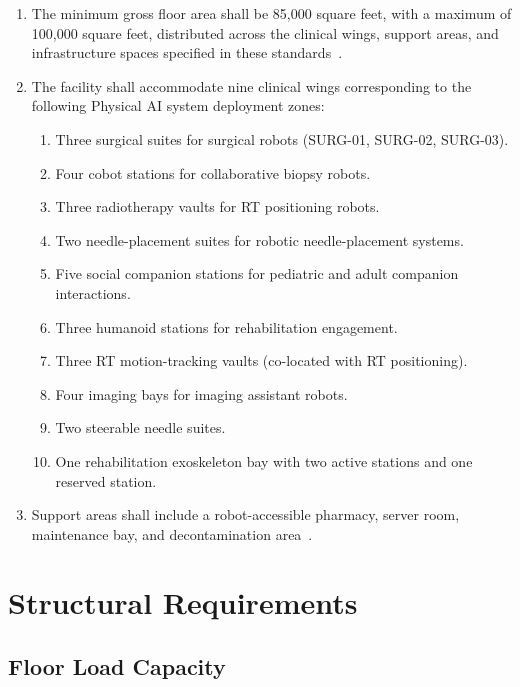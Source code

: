 \begin{enumerate}[label=(\alph*)]
\item The minimum gross floor area shall be 85,000 square feet, with a maximum
  of 100,000 square feet, distributed across the clinical wings, support areas,
  and infrastructure spaces specified in these standards~\cite{sitespec2026}.

\item The facility shall accommodate nine clinical wings corresponding to the
  following Physical AI system deployment zones:
  \begin{enumerate}[label=(\arabic*)]
  \item Three surgical suites for surgical robots (SURG-01, SURG-02, SURG-03).
  \item Four cobot stations for collaborative biopsy robots.
  \item Three radiotherapy vaults for RT positioning robots.
  \item Two needle-placement suites for robotic needle-placement systems.
  \item Five social companion stations for pediatric and adult companion
    interactions.
  \item Three humanoid stations for rehabilitation engagement.
  \item Three RT motion-tracking vaults (co-located with RT positioning).
  \item Four imaging bays for imaging assistant robots.
  \item Two steerable needle suites.
  \item One rehabilitation exoskeleton bay with two active stations and one
    reserved station.
  \end{enumerate}

\item Support areas shall include a robot-accessible pharmacy, server room,
  maintenance bay, and decontamination area~\cite{newtrial2026}.
\end{enumerate}

\section{Structural Requirements}

\subsection{Floor Load Capacity}

